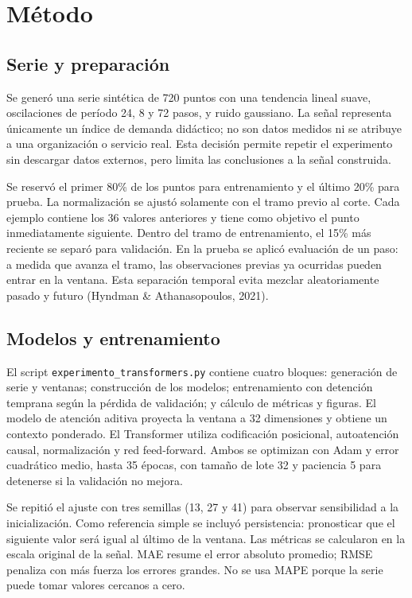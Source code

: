 \documentclass[12pt]{article}
\begin{document}
\section{Método}
\subsection{Serie y preparación}
Se generó una serie sintética de 720 puntos con una tendencia lineal suave, oscilaciones de período 24, 8 y 72 pasos, y ruido gaussiano. La señal representa únicamente un índice de demanda didáctico; no son datos medidos ni se atribuye a una organización o servicio real. Esta decisión permite repetir el experimento sin descargar datos externos, pero limita las conclusiones a la señal construida.

Se reservó el primer 80\% de los puntos para entrenamiento y el último 20\% para prueba. La normalización se ajustó solamente con el tramo previo al corte. Cada ejemplo contiene los 36 valores anteriores y tiene como objetivo el punto inmediatamente siguiente. Dentro del tramo de entrenamiento, el 15\% más reciente se separó para validación. En la prueba se aplicó evaluación de un paso: a medida que avanza el tramo, las observaciones previas ya ocurridas pueden entrar en la ventana. Esta separación temporal evita mezclar aleatoriamente pasado y futuro (Hyndman \& Athanasopoulos, 2021).

\subsection{Modelos y entrenamiento}
El script \texttt{experimento\_transformers.py} contiene cuatro bloques: generación de serie y ventanas; construcción de los modelos; entrenamiento con detención temprana según la pérdida de validación; y cálculo de métricas y figuras. El modelo de atención aditiva proyecta la ventana a 32 dimensiones y obtiene un contexto ponderado. El Transformer utiliza codificación posicional, autoatención causal, normalización y red feed-forward. Ambos se optimizan con Adam y error cuadrático medio, hasta 35 épocas, con tamaño de lote 32 y paciencia 5 para detenerse si la validación no mejora.

Se repitió el ajuste con tres semillas (13, 27 y 41) para observar sensibilidad a la inicialización. Como referencia simple se incluyó persistencia: pronosticar que el siguiente valor será igual al último de la ventana. Las métricas se calcularon en la escala original de la señal. MAE resume el error absoluto promedio; RMSE penaliza con más fuerza los errores grandes. No se usa MAPE porque la serie puede tomar valores cercanos a cero.
\end{document}
